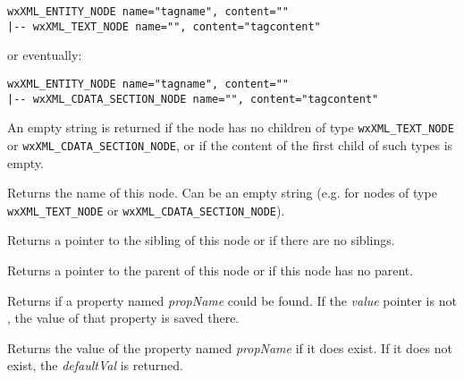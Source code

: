 \begin{verbatim}
wxXML_ENTITY_NODE name="tagname", content=""
|-- wxXML_TEXT_NODE name="", content="tagcontent"
\end{verbatim}

or eventually:

\begin{verbatim}
wxXML_ENTITY_NODE name="tagname", content=""
|-- wxXML_CDATA_SECTION_NODE name="", content="tagcontent"
\end{verbatim}

An empty string is returned if the node has no children of type \texttt{wxXML\_TEXT\_NODE} or \texttt{wxXML\_CDATA\_SECTION\_NODE}, or if the content of the first child of such types is empty.


\label{wxxmlnodegetname}


Returns the name of this node. Can be an empty string (e.g. for nodes of type {\tt wxXML\_TEXT\_NODE} or {\tt wxXML\_CDATA\_SECTION\_NODE}).

\label{wxxmlnodegetnext}


Returns a pointer to the sibling of this node or \NULL if there are no siblings.

\label{wxxmlnodegetparent}


Returns a pointer to the parent of this node or \NULL if this node has no parent.

\label{wxxmlnodegetpropval}


Returns \true if a property named {\it propName} could be found.
If the {\it value} pointer is not \NULL, the value of that property is saved there.


Returns the value of the property named {\it propName} if it does exist.
If it does not exist, the {\it defaultVal} is returned.

\label{wxxmlnodegetproperties}

